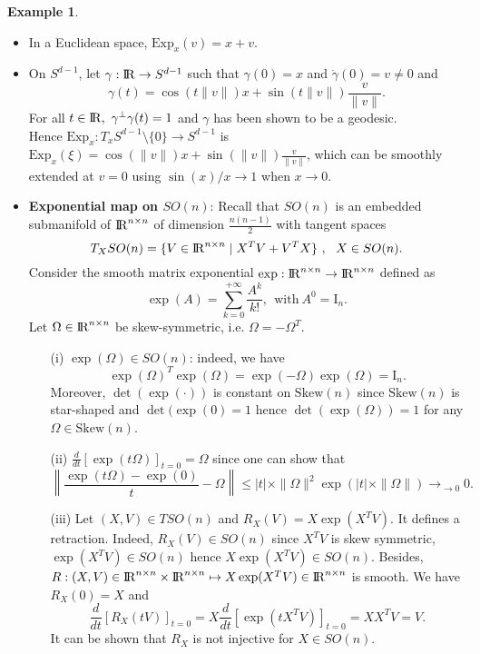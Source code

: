 \documentclass[10pt,a4paper]{book}
\theoremstyle{definition}
\newtheorem{exm}{Example}[section]
\theoremstyle{plain}
\theoremstyle{remark}
\def\R{{\rm I\kern-0.16em R}}
\begin{document}
\begin{exm}~
\begin{itemize}
\item In a Euclidean space, $\text{Exp}_x(v)=x+v$. 
\item On $S^{d-1}$, let $\gamma:\R \to S^{d-1}$ such that $\gamma(0)=x$ and $\dot{\gamma}(0)=v\neq 0$ and
$$\gamma(t)=\cos(t\|v\|)x+\sin(t\|v\|)\frac{v}{\|v\|}.$$
For all $t\in \R,~\gamma^{\bot}\gamma(t)=1$ and $\gamma$ has been shown to be a geodesic. \\Hence $\text{Exp}_x:T_xS^{d-1}\setminus\{0\}\to S^{d-1}$ is $\text{Exp}_x(\xi)=\cos(\|v\|)x+\sin(\|v\|)\frac{v}{\|v\|}$, which can be smoothly extended at $v=0$ using $\sin(x)/x\to 1$ when $x\to 0$.
\item \textbf{Exponential map on $SO(n)$}: Recall that $SO(n)$ is an embedded submanifold of $\R^{n\times n}$ of dimension $\frac{n(n-1)}{2}$ with tangent spaces
$$T_XSO(n)=\{V\in \R^{n\times n}\mid X^T V +V^{T}X\}~,~~X\in SO(n).$$
Consider the smooth matrix exponential $\exp:\R^{n\times n}\to \R^{n\times n}$ defined as
$$\exp(A)=\sum_{k=0}^{+\infty}\frac{A^k}{k!},~~\text{with}~A^{0}=\text{I}_n.$$
Let $\Omega\in \R^{n\times n}$ be skew-symmetric, i.e. $\Omega=-\Omega^{T}$.
\begin{itemize}
\item[(i)] $\exp(\Omega)\in SO(n)$: indeed, we have
$$\exp(\Omega)^{T}\exp(\Omega)=\exp(-\Omega)\exp(\Omega)=\text{I}_n.$$
Moreover, $\det(\exp(\cdot))$ is constant on $\text{Skew}(n)$ since $\text{Skew}(n)$ is  star-shaped and $\det(\exp(0)=1$ hence $\det(\exp(\Omega))=1$ for any $\Omega \in \text{Skew}(n)$.
\item[(ii)] $\frac{d}{dt}[\exp(t\Omega)]_{t=0}=\Omega$ since one can show that
$$\left\|\frac{\exp(t\Omega)-\exp(0)}{t}-\Omega\right\| \leq |t| \times \|\Omega\|^2\exp(|t|\times \|\Omega\|) \to_{\to 0} 0.$$
\item[(iii)] Let $(X,V)\in TSO(n)$ and $R_X(V)=X\exp(X^TV)$. It defines a retraction. Indeed, $R_X(V) \in SO(n)$ since $X^TV$ is skew symmetric, $\exp(X^TV)\in SO(n)$ hence $X\exp(X^TV)\in SO(n)$. Besides, $R:(X,V)\in \R^{n\times n}\times \R^{n\times n} \mapsto X\exp(X^{T}V)\in \R^{n\times n}$ is smooth. We have $R_X(0)=X$ and
$$\frac{d}{dt}[R_X(tV)]_{t=0}=X\frac{d}{dt}[\exp(tX^{T}V)]_{t=0}=XX^{T}V=V.$$
It can be shown that $R_X$ is not injective for $X\in SO(n)$.
\end{itemize}

\end{itemize}

\end{exm}
\end{document}
